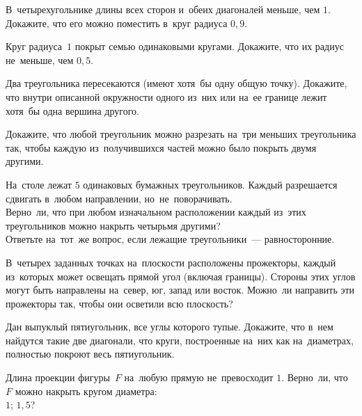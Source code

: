 



\begin{problems}

\item
В~четырехугольнике длины всех сторон и~обеих диагоналей меньше, чем $1$.
Докажите, что его можно поместить в~круг радиуса $0{,}9$.

\item
Круг радиуса~$1$ покрыт семью одинаковыми кругами.
Докажите, что их радиус не~меньше, чем $0{,}5$.

\item
Два треугольника пересекаются (имеют хотя~бы одну общую точку).
Докажите, что внутри описанной окружности одного из~них или на~ее границе лежит
хотя~бы одна вершина другого.

\item
Докажите, что любой треугольник можно разрезать на~три меньших треугольника
так, чтобы каждую из~получившихся частей можно было покрыть двумя другими.

\item
На~столе лежат $5$ одинаковых бумажных треугольников.
Каждый разрешается сдвигать в~любом направлении, но~не~поворачивать.
\\
\subproblem
Верно~ли, что при любом изначальном расположении каждый из~этих треугольников
можно накрыть четырьмя другими?
\\
\subproblem
Ответьте на~тот~же вопрос, если лежащие треугольники~--- равносторонние.

\item
В~четырех заданных точках на~плоскости расположены прожекторы, каждый
из~которых может освещать прямой угол (включая границы).
Стороны этих углов могут быть направлены на~север, юг, запад или восток.
Можно~ли направить эти прожекторы так, чтобы они осветили всю плоскость?

\item
Дан выпуклый пятиугольник, все углы которого тупые.
Докажите, что в~нем найдутся такие две диагонали, что круги, построенные на~них
как на~диаметрах, полностью покроют весь пятиугольник.

\item
Длина проекции фигуры~$F$ на~любую прямую не~превосходит $1$.
Верно~ли, что $F$ можно накрыть кругом диаметра:
\\
\subproblem $1$;
\qquad
\subproblem $1{,}5$?


\end{problems}
